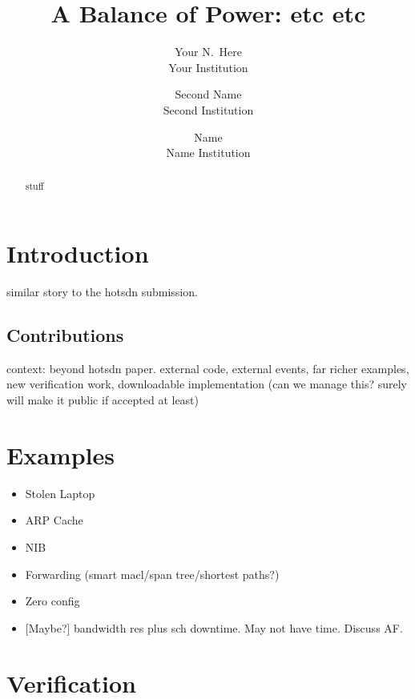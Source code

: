 \documentclass[letterpaper,twocolumn,10pt]{article}
\begin{document}
\date{}

\title{\Large \bf A Balance of Power: etc etc}

\author{
{\rm Your N.\ Here}\\
Your Institution
\and
{\rm Second Name}\\
Second Institution
 \and
 {\rm Name}\\
Name Institution
} %


\maketitle

\begin{abstract}
stuff
\end{abstract}

\section{Introduction}

similar story to the hotsdn submission. 

\subsection{Contributions}

context: beyond hotsdn paper. external code, external events, far
richer examples, new verification work, downloadable
implementation (can we manage this? surely will make it public if
accepted at least)

\section{Examples}

\begin{itemize}
  \item{Stolen Laptop}
  \item{ARP Cache}
  \item{NIB}
  \item{Forwarding (smart macl/span tree/shortest paths?)}
  \item{Zero config}

  \item{[Maybe?] bandwidth res plus sch downtime. May not have
time. Discuss AF.}

\end{itemize}

\section{Verification}
\end{document}
